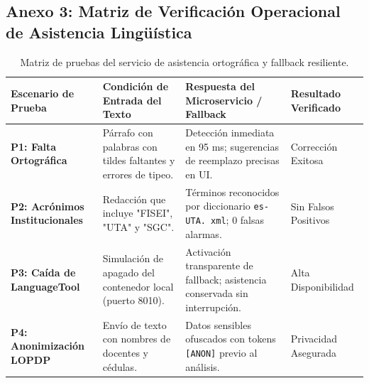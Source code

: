 \documentclass[12pt,a4paper]{article}
\begin{document}
\subsection*{Anexo 3: Matriz de Verificación Operacional de Asistencia Lingüística}
\begin{table}[H]
\centering
\small
\renewcommand{\arraystretch}{1.15}
\begin{tabularx}{\textwidth}{|>{\hsize=0.75\hsize\raggedright\arraybackslash\bfseries\footnotesize}X|>{\hsize=1.25\hsize\raggedright\arraybackslash\footnotesize}X|>{\hsize=1.35\hsize\raggedright\arraybackslash\footnotesize}X|>{\hsize=0.65\hsize\centering\arraybackslash\footnotesize}X|}
\hline
\rowcolor{tableheader}
\textbf{Escenario de Prueba} & \textbf{Condición de Entrada del Texto} & \textbf{Respuesta del Microservicio / Fallback} & \textbf{Resultado Verificado} \\
\hline
P1: Falta Ortográfica & Párrafo con palabras con tildes faltantes y errores de tipeo. & Detección inmediata en 95 ms; sugerencias de reemplazo precisas en UI. & Corrección Exitosa \\
\hline
P2: Acrónimos Institucionales & Redacción que incluye "FISEI", "UTA" y "SGC". & Términos reconocidos por diccionario \texttt{es- UTA. xml}; 0 falsas alarmas. & Sin Falsos Positivos \\
\hline
P3: Caída de LanguageTool & Simulación de apagado del contenedor local (puerto 8010). & Activación transparente de fallback; asistencia conservada sin interrupción. & Alta Disponibilidad \\
\hline
P4: Anonimización LOPDP & Envío de texto con nombres de docentes y cédulas. & Datos sensibles ofuscados con tokens \texttt{[ANON]} previo al análisis. & Privacidad Asegurada \\
\hline
\end{tabularx}
\caption{Matriz de pruebas del servicio de asistencia ortográfica y fallback resiliente.}
\end{table}
\end{document}
